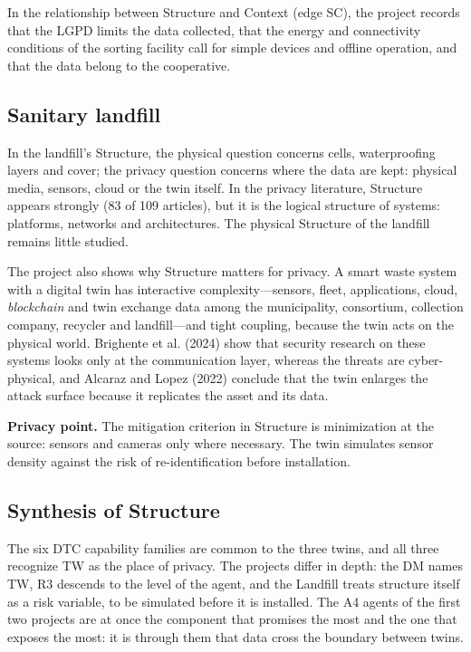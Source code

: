 \documentclass[12pt,a4paper,article,oneside,brazil,english]{abntex2}
\begin{document}
In the relationship between Structure and Context (edge SC), the project records that the LGPD limits the data collected, that the energy and connectivity conditions of the sorting facility call for simple devices and offline operation, and that the data belong to the cooperative.

\subsection{Sanitary landfill}

In the landfill's Structure, the physical question concerns cells, waterproofing layers and cover; the privacy question concerns where the data are kept: physical media, sensors, cloud or the twin itself. In the privacy literature, Structure appears strongly (83 of 109 articles), but it is the logical structure of systems: platforms, networks and architectures. The physical Structure of the landfill remains little studied.

The project also shows why Structure matters for privacy. A smart waste system with a digital twin has interactive complexity---sensors, fleet, applications, cloud, \textit{blockchain} and twin exchange data among the municipality, consortium, collection company, recycler and landfill---and tight coupling, because the twin acts on the physical world. Brighente et al. (2024) show that security research on these systems looks only at the communication layer, whereas the threats are cyber-physical, and Alcaraz and Lopez (2022) conclude that the twin enlarges the attack surface because it replicates the asset and its data.

\textbf{Privacy point.} The mitigation criterion in Structure is minimization at the source: sensors and cameras only where necessary. The twin simulates sensor density against the risk of re-identification before installation.

\subsection{Synthesis of Structure}

The six DTC capability families are common to the three twins, and all three recognize TW as the place of privacy. The projects differ in depth: the DM names TW, R3 descends to the level of the agent, and the Landfill treats structure itself as a risk variable, to be simulated before it is installed. The A4 agents of the first two projects are at once the component that promises the most and the one that exposes the most: it is through them that data cross the boundary between twins.
\end{document}
